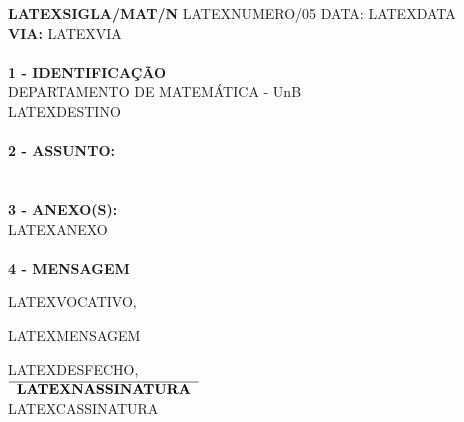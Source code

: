 \documentclass[12pt]{artigo}
\begin{document}
\vspace*{.8cm}
\timbrado
\parindent=2cm 
\setlength{\baselineskip}{5mm}
\noindent 
\begin{minipage}{16cm}
\vspace*{-12mm}
\parindent=2cm
\setlength{\baselineskip}{5mm}
\vspace*{.2cm}
\noindent
\small
{\bf  LATEXSIGLA/MAT/N\primo} LATEXNUMERO/05 \hfill {DATA:} {LATEXDATA}
\vum \\
{\bf VIA:} {LATEXVIA}  
\\
\mbox{} \hrulefill\
\\
{\bf 1 - IDENTIFICA\c{C}\~AO} 
\\
\phantom{xxx}{\bf Proced\^encia:} {DEPARTAMENTO DE MATEM\'ATICA - UnB}
\\
 {LATEXDESTINO}
\\
\mbox{} \hrulefill\
\\
{\bf 2 - ASSUNTO:} \\
\phantom{xxx}{LATEXASSUNTO}
\\
\mbox{} \hrulefill\
\\
{\bf 3 - ANEXO(S):} 
\\
\phantom{xxx} {LATEXANEXO}
\\
\mbox{} \hrulefill\
\\
{ \bf 4 - MENSAGEM} 
\end{minipage}
\setlength{\baselineskip}{9mm}
\vspace*{.92cm} 

LATEXVOCATIVO,
\vspace*{8mm} 

LATEXMENSAGEM
\vspace*{15mm} 
\begin{center} 
\setlength{\baselineskip}{6mm}
LATEXDESFECHO,
\vspace*{15mm} \\
$\overline{\phantom{x}\mbox{\bf LATEXNASSINATURA} \phantom{x}}$ 
\\
LATEXCASSINATURA
\end{center}
\end{document}
